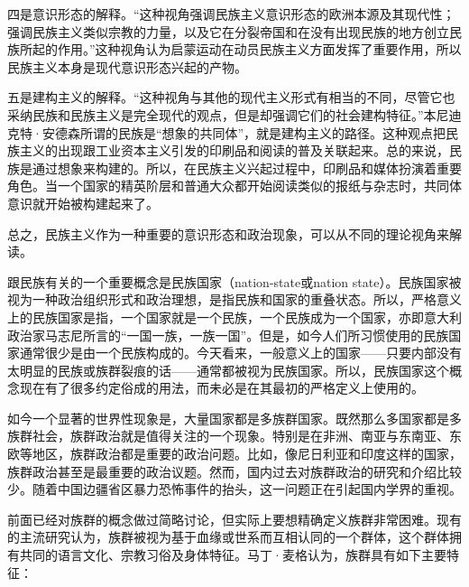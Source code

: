 四是意识形态的解释。“这种视角强调民族主义意识形态的欧洲本源及其现代性；强调民族主义类似宗教的力量，以及它在分裂帝国和在没有出现民族的地方创立民族所起的作用。”这种视角认为启蒙运动在动员民族主义方面发挥了重要作用，所以民族主义本身是现代意识形态兴起的产物。

五是建构主义的解释。“这种视角与其他的现代主义形式有相当的不同，尽管它也采纳民族和民族主义是完全现代的观点，但是却强调它们的社会建构特征。”本尼迪克特·安德森所谓的民族是“想象的共同体”，就是建构主义的路径。这种观点把民族主义的出现跟工业资本主义引发的印刷品和阅读的普及关联起来。总的来说，民族是通过想象来构建的。所以，在民族主义兴起过程中，印刷品和媒体扮演着重要角色。当一个国家的精英阶层和普通大众都开始阅读类似的报纸与杂志时，共同体意识就开始被构建起来了。

总之，民族主义作为一种重要的意识形态和政治现象，可以从不同的理论视角来解读。


跟民族有关的一个重要概念是民族国家（nation-state或nation state）。民族国家被视为一种政治组织形式和政治理想，是指民族和国家的重叠状态。所以，严格意义上的民族国家是指，一个国家就是一个民族，一个民族成为一个国家，亦即意大利政治家马志尼所言的“一国一族，一族一国”。但是，如今人们所习惯使用的民族国家通常很少是由一个民族构成的。今天看来，一般意义上的国家——只要内部没有太明显的民族或族群裂痕的话——通常都被视为民族国家。所以，民族国家这个概念现在有了很多约定俗成的用法，而未必是在其最初的严格定义上使用的。

如今一个显著的世界性现象是，大量国家都是多族群国家。既然那么多国家都是多族群社会，族群政治就是值得关注的一个现象。特别是在非洲、南亚与东南亚、东欧等地区，族群政治都是重要的政治问题。比如，像尼日利亚和印度这样的国家，族群政治甚至是最重要的政治议题。然而，国内过去对族群政治的研究和介绍比较少。随着中国边疆省区暴力恐怖事件的抬头，这一问题正在引起国内学界的重视。

前面已经对族群的概念做过简略讨论，但实际上要想精确定义族群非常困难。现有的主流研究认为，族群被视为基于血缘或世系而互相认同的一个群体，这个群体拥有共同的语言文化、宗教习俗及身体特征。马丁·麦格认为，族群具有如下主要特征：


